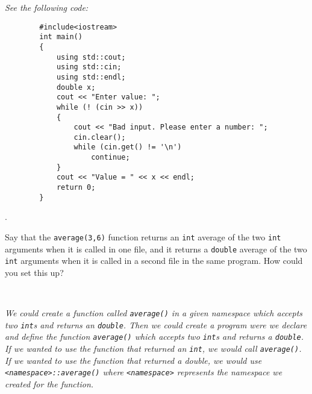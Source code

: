 \documentclass{amsart}
\begin{document}
\phantom{}
\vfill
\phantom{2. } 
\begin{minipage}[t]{11.5 cm}
	{\slshape See the following code:}
	\begin{verbatim}
		#include<iostream>
		int main()
		{
		    using std::cout;
		    using std::cin;
		    using std::endl;
		    double x;
		    cout << "Enter value: ";
		    while (! (cin >> x))
		    {
		        cout << "Bad input. Please enter a number: ";
		        cin.clear();
		        while (cin.get() != '\n')
		            continue;
		    }
		    cout << "Value = " << x << endl;
		    return 0;
		}
	\end{verbatim} 
\end{minipage} 
\vfill

. 
\begin{minipage}[t]{11.5 cm}
	Say that the \verb+average(3,6)+ function returns an \verb+int+ average of the two \verb+int+ arguments when it is called in one file, and it returns a \verb+double+ average of the two \verb+int+ arguments when it is called in a second file in the same program. How could you set this up?
\end{minipage} \\[1ex]
\phantom{3. } 
\begin{minipage}[t]{11.5 cm}
	{\slshape 
	We could create a function called \verb+average()+ in a given
	namespace which accepts two \verb+int+s and returns an \verb+double+.
	Then we could create a program were we declare and define the 
	function \verb+average()+ which accepts two \verb+int+s and returns
	a \verb+double+.
	If we wanted to use the function that returned an \verb+int+, we 
	would call \verb+average()+. 
	If we wanted to use the function that returned a double, we would
	use \verb+<namespace>::average()+ where \verb+<namespace>+
	represents the namespace we created for the function.
	} 
\end{minipage} 
\vfill
\newpage
\end{document}
